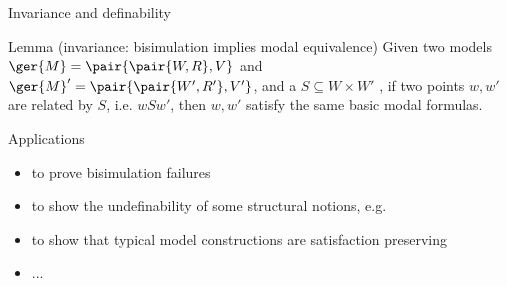 \documentclass{beamer}
\begin{document}
\begin{slide}{Invariance and definability}\label{s:31}
\small
\begin{block}{Lemma (invariance: bisimulation implies modal equivalence)}
Given two models $\ger{M} = \pair{\pair{W, R}, V}$ and $\ger{M}' = \pair{\pair{W', R'}, V'}$, and a  
$S \subseteq W \times W'$ , if two points $w, w'$ are related by $S$, i.e. $w S w'$, then $w, w'$  satisfy the same basic modal formulas.
 \end{block}
\begin{block}{Applications}
\begin{itemize}
\item to prove bisimulation failures
\item to show the undefinability of some structural notions, e.g. 
\item  to show that typical model constructions are satisfaction preserving
\item ...
\end{itemize}
\end{block}
\end{slide}
\end{document}
